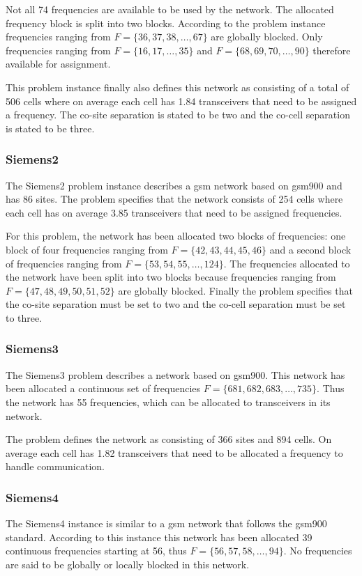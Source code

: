Not all 74 frequencies are available to be used by the network. The allocated frequency block is split into two blocks. According to the problem instance frequencies ranging from $F= \{36,37,38,\dots,67\}$ are globally blocked. Only frequencies ranging from $F= \{16,17,\dots,35\}$ and $F= \{68,69,70,\dots,90\}$ therefore available for assignment.

This problem instance finally also defines this network as consisting of a total of 506 cells where on average each cell has 1.84 transceivers that need to be assigned a frequency. The co-site separation is stated to be two and the co-cell separation is stated to be three.
\subsubsection{Siemens2}
The Siemens2 problem instance describes a \gls{gsm} network based on \gls{gsm}900 and has 86 sites. The problem specifies that the network consists of 254 cells where each cell has on average 3.85 transceivers that need to be assigned frequencies.

For this problem, the network has been allocated two blocks of frequencies: one block of four frequencies ranging from $F = \{42,43,44,45,46\}$ and a second block of frequencies ranging from $F= \{53,54,55,\dots,124\}$. The frequencies allocated to the network have been split into two blocks because frequencies ranging from $F = \{47,48,49,50,51,52\}$ are globally blocked. Finally the problem specifies that the co-site separation must be set to two and the co-cell separation must be set to three.
\subsubsection{Siemens3}
The Siemens3 problem describes a network based on \gls{gsm}900. This network has been allocated a continuous set of frequencies $F= \{681,682,683, \dots, 735\}$. Thus the network has 55 frequencies, which can be allocated to transceivers in its network.

The problem defines the network as consisting of 366 sites and 894 cells. On average each cell has 1.82 transceivers that need to be allocated a frequency to handle communication.
\subsubsection{Siemens4}
The Siemens4 instance is similar to a \gls{gsm} network that follows the \gls{gsm}900 standard. According to this instance this network has been allocated 39 continuous frequencies starting at 56, thus $F = \{56,57,58,\dots,94\}$. No frequencies are said to be globally or locally blocked in this network.

